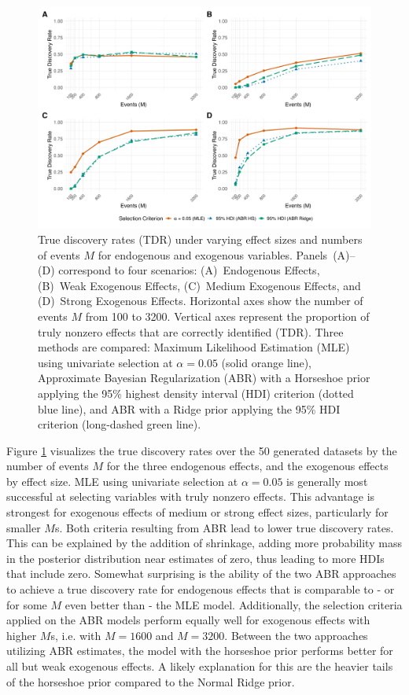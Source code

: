 \documentclass{article}
\begin{document}
\begin{spacing}{2}
\begin{justify}
\begin{figure}[H]
    \centering
    \includegraphics[width=\textwidth]{img/true_discovery_rates.png}
    \caption{True discovery rates (TDR) under varying effect sizes and numbers of events $M$ for endogenous and exogenous variables. Panels~(A)--(D) correspond to four scenarios: (A)~Endogenous Effects, (B)~Weak Exogenous Effects, (C)~Medium Exogenous Effects, and (D)~Strong Exogenous Effects. Horizontal axes show the number of events $M$ from 100 to 3200. Vertical axes represent the proportion of truly nonzero effects that are correctly identified (TDR). Three methods are compared: Maximum Likelihood Estimation (MLE) using univariate selection at $\alpha=0.05$ (solid orange line), Approximate Bayesian Regularization (ABR) with a Horseshoe prior applying the 95\% highest density interval (HDI) criterion (dotted blue line), and ABR with a Ridge prior applying the 95\% HDI criterion (long-dashed green line).}
    \label{fig:true_discovery_rates}
\end{figure}

Figure \ref{fig:true_discovery_rates} visualizes the true discovery rates over the 50 generated datasets by the number of events $M$ for the three endogenous effects, and the exogenous effects by effect size. MLE using univariate selection at $\alpha=0.05$ is generally most successful at selecting variables with truly nonzero effects. This advantage is strongest for exogenous effects of medium or strong effect sizes, particularly for smaller $M$s. Both criteria resulting from ABR  lead to lower true discovery rates. This can be explained by the addition of shrinkage, adding more probability mass in the posterior distribution near estimates of zero, thus leading to more HDIs that include zero. Somewhat surprising is the ability of the two ABR approaches to achieve a true discovery rate for endogenous effects that is comparable to - or for some $M$ even better than - the MLE model. Additionally, the selection criteria applied on the ABR models perform equally well for exogenous effects with higher $M$s, i.e. with $M=1600$ and $M=3200$. Between the two approaches utilizing ABR estimates, the model with the horseshoe prior performs better for all but weak exogenous effects. A likely explanation for this are the heavier tails of the horseshoe prior compared to the Normal Ridge prior. 


\end{justify}
\end{spacing}
\end{document}
